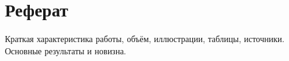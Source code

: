 \chapter*{Реферат}
Краткая характеристика работы, объём, иллюстрации, таблицы, источники. Основные результаты и новизна.



